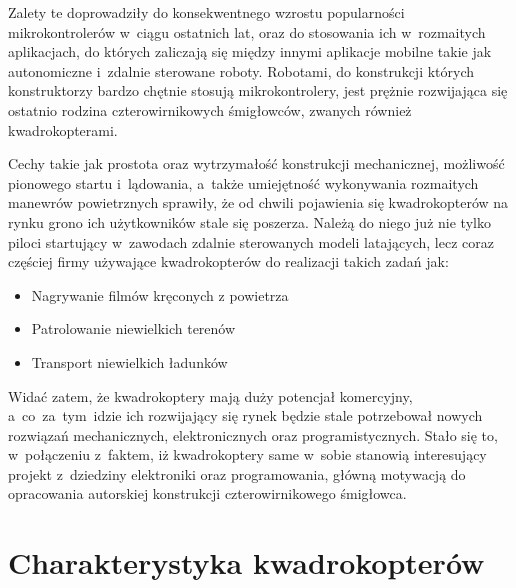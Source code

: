 \documentclass[11pt, twoside]{Thesis} %
\begin{document}
Zalety te doprowadziły do konsekwentnego wzrostu popularności mikrokontrolerów w~ciągu ostatnich lat, oraz do stosowania ich w~rozmaitych aplikacjach, do których zaliczają się między innymi aplikacje mobilne takie jak autonomiczne i~zdalnie sterowane roboty.
Robotami, do konstrukcji których konstruktorzy bardzo chętnie stosują mikrokontrolery, jest prężnie rozwijająca się ostatnio rodzina czterowirnikowych śmigłowców, zwanych również kwadrokopterami. 

Cechy takie jak prostota oraz wytrzymałość konstrukcji mechanicznej, możliwość pionowego startu i~lądowania, a~także umiejętność wykonywania rozmaitych manewrów powietrznych sprawiły, że od chwili pojawienia się kwadrokopterów na rynku grono ich użytkowników stale się poszerza.
Należą do niego już nie tylko piloci startujący w~zawodach zdalnie sterowanych modeli latających, lecz coraz częściej firmy używające kwadrokopterów do realizacji takich zadań jak:

\begin{itemize}
	\item Nagrywanie filmów kręconych z powietrza
	\item Patrolowanie niewielkich terenów
	\item Transport niewielkich ładunków
\end{itemize}
 
Widać zatem, że kwadrokoptery mają duży potencjał komercyjny, a~co~za~tym~idzie ich rozwijający się rynek będzie stale potrzebował nowych rozwiązań mechanicznych, elektronicznych oraz programistycznych. Stało się to, w~połączeniu z~faktem, iż kwadrokoptery same w~sobie stanowią interesujący projekt z~dziedziny elektroniki oraz programowania, główną motywacją do opracowania autorskiej konstrukcji czterowirnikowego śmigłowca.

 

% 

\chapter{Charakterystyka kwadrokopterów} %

\label{Chapter2} %
\end{document}
